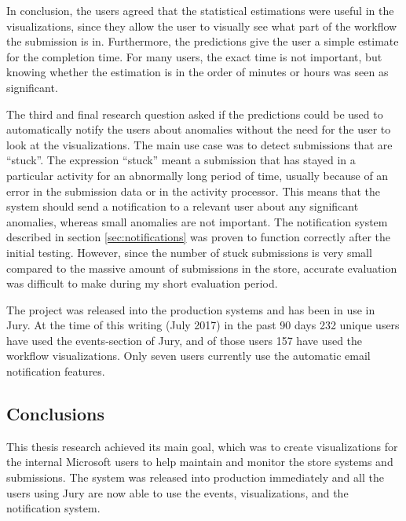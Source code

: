 In conclusion, the users agreed that the statistical estimations were useful in the visualizations, since they allow the user to visually see what part of the workflow the submission is in.
Furthermore, the predictions give the user a simple estimate for the completion time. 
For many users, the exact time is not important, but knowing whether the estimation is in the order of minutes or hours was seen as significant.


The third and final research question asked if the predictions could be used to automatically notify the users about anomalies without the need for the user to look at the visualizations.
The main use case was to detect submissions that are ``stuck''.
The expression ``stuck'' meant a submission that has stayed in a particular activity for an abnormally long period of time, usually because of an error in the submission data or in the activity processor.
This means that the system should send a notification to a relevant user about any significant anomalies, whereas small anomalies are not important.
The notification system described in section \ref{sec:notifications} was proven to function correctly after the initial testing. 
However, since the number of stuck submissions is very small compared to the massive amount of submissions in the store, accurate evaluation was difficult to make during my short evaluation period.

The project was released into the production systems and has been in use in Jury.
At the time of this writing (July 2017) in the past 90 days 232 unique users have used the events-section of Jury, and of those users 157 have used the workflow visualizations.
Only seven users currently use the automatic email notification features.


\subsection{Conclusions} 
\label{sec:conclusions}

This thesis research achieved its main goal, which was to create visualizations for the internal Microsoft users to help maintain and monitor the store systems and submissions.
The system was released into production immediately and all the users using Jury are now able to use the events, visualizations, and the notification system.

